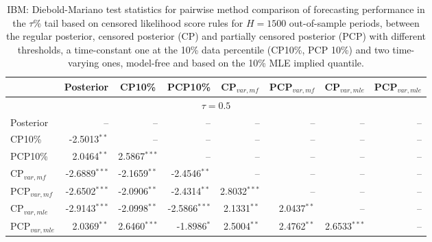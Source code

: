 { \renewcommand{\arraystretch}{1.2} 
 {\footnotesize 
\begin{table} 
\center 
\begin{tabular}{l | rrrrrrr} 
& \multicolumn{1}{c}{Posterior}& \multicolumn{1}{c}{CP10\%}& \multicolumn{1}{c}{PCP10\%}& \multicolumn{1}{c}{CP$_{var,mf}$}& \multicolumn{1}{c}{PCP$_{var,mf}$}& \multicolumn{1}{c}{CP$_{var,mle}$}& \multicolumn{1}{c}{PCP$_{var,mle}$} \\ \hline 
\multicolumn{8}{c}{$\tau = 0.5$} \\ \hline 
Posterior &    --\phantom{$^{***}$} &    --\phantom{$^{***}$} &    --\phantom{$^{***}$} &    --\phantom{$^{***}$} &    --\phantom{$^{***}$} &    --\phantom{$^{***}$} &    --\phantom{$^{***}$}   \\ 
CP10\% & -2.5013$^{**}$\phantom{$^{*}$} &    --\phantom{$^{***}$} &    --\phantom{$^{***}$} &    --\phantom{$^{***}$} &    --\phantom{$^{***}$} &    --\phantom{$^{***}$} &    --\phantom{$^{***}$}   \\ 
PCP10\% & 2.0464$^{**}$\phantom{$^{*}$} & 2.5867$^{***}$ &    --\phantom{$^{***}$} &    --\phantom{$^{***}$} &    --\phantom{$^{***}$} &    --\phantom{$^{***}$} &    --\phantom{$^{***}$}   \\ 
CP$_{var,mf}$ & -2.6889$^{***}$ & -2.1659$^{**}$\phantom{$^{*}$} & -2.4546$^{**}$\phantom{$^{*}$} &    --\phantom{$^{***}$} &    --\phantom{$^{***}$} &    --\phantom{$^{***}$} &    --\phantom{$^{***}$}   \\ 
PCP$_{var,mf}$ & -2.6502$^{***}$ & -2.0906$^{**}$\phantom{$^{*}$} & -2.4314$^{**}$\phantom{$^{*}$} & 2.8032$^{***}$ &    --\phantom{$^{***}$} &    --\phantom{$^{***}$} &    --\phantom{$^{***}$}   \\ 
CP$_{var,mle}$ & -2.9143$^{***}$ & -2.0998$^{**}$\phantom{$^{*}$} & -2.5866$^{***}$ & 2.1331$^{**}$\phantom{$^{*}$} & 2.0437$^{**}$\phantom{$^{*}$} &    --\phantom{$^{***}$} &    --\phantom{$^{***}$}   \\ 
PCP$_{var,mle}$ & 2.0369$^{**}$\phantom{$^{*}$} & 2.6460$^{***}$ & -1.8986$^{*}$\phantom{$^{**}$} & 2.5004$^{**}$\phantom{$^{*}$} & 2.4762$^{**}$\phantom{$^{*}$} & 2.6533$^{***}$ &    --\phantom{$^{***}$}   \\ 
\hline 
\end{tabular}
 \caption{IBM: Diebold-Mariano test statistics for pairwise method comparison  of forecasting performance in the $\tau$\% tail based on  censored likelihood score rules for $H=1500$ out-of-sample periods,  between  the regular posterior, censored posterior (CP) and  partially censored posterior (PCP) with different thresholds,  a time-constant one at the 10\% data percentile (CP10\%, PCP 10\%) and two time-varying ones, model-free and based on the 10\% MLE implied quantile. }
\label{tab:IBM_DM_0.5}  
\end{table}
}}